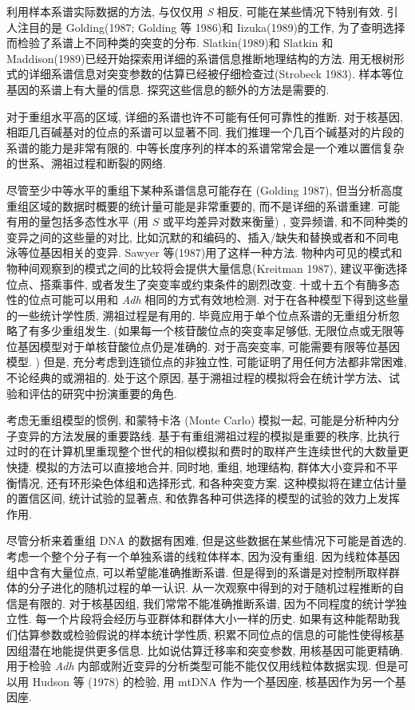 \documentclass[12pt]{article}
\begin{document}
利用样本系谱实际数据的方法, 与仅仅用 \textit{S} 相反, 可能在某些情况下特别有效. 引人注目的是 Golding(1987; Golding 等
1986)和 Iizuka(1989)的工作, 为了查明选择而检验了系谱上不同种类的突变的分布. Slatkin(1989)和 Slatkin 和
Maddison(1989)已经开始探索用详细的系谱信息推断地理结构的方法.
用无根树形式的详细系谱信息对突变参数的估算已经被仔细检查过(Strobeck 1983). 样本等位基因的系谱上有大量的信息.
探究这些信息的额外的方法是需要的.

对于重组水平高的区域, 详细的系谱也许不可能有任何可靠性的推断. 对于核基因, 相距几百碱基对的位点的系谱可以显著不同.
我们推理一个几百个碱基对的片段的系谱的能力是非常有限的.
中等长度序列的样本的系谱常常会是一个难以置信复杂的世系、溯祖过程和断裂的网络.

尽管至少中等水平的重组下某种系谱信息可能存在 (Golding 1987), 但当分析高度重组区域的数据时概要的统计量可能是非常重要的,
而不是详细的系谱重建. 可能有用的量包括多态性水平 (用 $S$ 或平均差异对数来衡量) , 变异频谱,
和不同种类的变异之间的这些量的对比, 比如沉默的和编码的、插入/缺失和替换或者和不同电泳等位基因相关的变异. Sawyer
等(1987)用了这样一种方法. 物种内可见的模式和物种间观察到的模式之间的比较将会提供大量信息(Kreitman 1987),
建议平衡选择位点、搭乘事件, 或者发生了突变率或约束条件的剧烈改变.
十或十五个有酶多态性的位点可能可以用和 \textit{Adh} 相同的方式有效地检测. 对于在各种模型下得到这些量的一些统计学性质,
溯祖过程是有用的. 毕竟应用于单个位点系谱的无重组分析忽略了有多少重组发生. (如果每一个核苷酸位点的突变率足够低,
无限位点或无限等位基因模型对于单核苷酸位点仍是准确的. 对于高突变率, 可能需要有限等位基因模型. ) 但是,
充分考虑到连锁位点的非独立性, 可能证明了用任何方法都非常困难, 不论经典的或溯祖的. 处于这个原因,
基于溯祖过程的模拟将会在统计学方法、试验和评估的研究中扮演重要的角色.

考虑无重组模型的惯例, 和蒙特卡洛 (Monte Carlo) 模拟一起, 可能是分析种内分子变异的方法发展的重要路线.
基于有重组溯祖过程的模拟是重要的秩序, 比执行过时的在计算机里重现整个世代的相似模拟和费时的取样产生连续世代的大数量更快捷.
模拟的方法可以直接地合并, 同时地, 重组, 地理结构, 群体大小变异和不平衡情况, 还有环形染色体组和选择形式, 和各种突变方案.
这种模拟将在建立估计量的置信区间, 统计试验的显著点, 和依靠各种可供选择的模型的试验的效力上发挥作用.

尽管分析来着重组 DNA 的数据有困难, 但是这些数据在某些情况下可能是首选的. 考虑一个整个分子有一个单独系谱的线粒体样本,
因为没有重组. 因为线粒体基因组中含有大量位点, 可以希望能准确推断系谱.
但是得到的系谱是对控制所取样群体的分子进化的随机过程的单一认识. 从一次观察中得到的对于随机过程推断的自信是有限的.
对于核基因组, 我们常常不能准确推断系谱, 因为不同程度的统计学独立性. 每一个片段将会经历与亚群体和群体大小一样的历史.
如果有这种能帮助我们估算参数或检验假说的样本统计学性质, 积累不同位点的信息的可能性使得核基因组潜在地能提供更多信息.
比如说估算迁移率和突变参数, 用核基因可能更精确.
用于检验 \textit{Adh} 内部或附近变异的分析类型可能不能仅仅用线粒体数据实现. 但是可以用 Hudson 等 (1978) 的检验, 用
mtDNA 作为一个基因座, 核基因作为另一个基因座.
\end{document}
